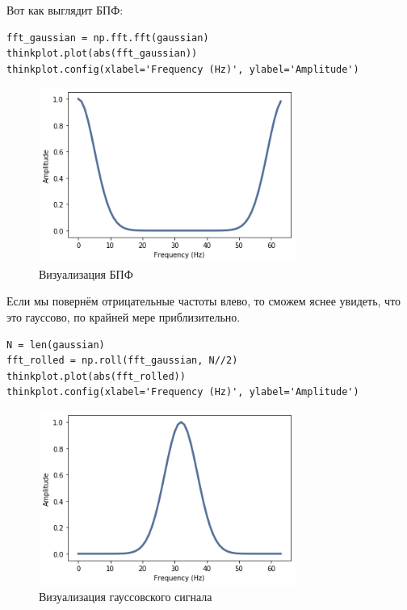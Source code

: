 \documentclass[a4paper,12pt]{report}
\begin{document}
Вот как выглядит БПФ:

\begin{lstlisting}[caption=Визуализация БПФ]
fft_gaussian = np.fft.fft(gaussian)
thinkplot.plot(abs(fft_gaussian))
thinkplot.config(xlabel='Frequency (Hz)', ylabel='Amplitude')
\end{lstlisting}

\begin{figure}[H]
        \centering
        \includegraphics[width=0.75\textwidth]{lab8_fig2_2.png}
        \caption{Визуализация БПФ}
        \label{fig:lab8_fig2_2}
\end{figure}

Если мы повернём отрицательные частоты влево, то сможем яснее увидеть, что это гауссово, по крайней мере приблизительно.

\begin{lstlisting}[caption=Визуализация гауссовского сигнала]
N = len(gaussian)
fft_rolled = np.roll(fft_gaussian, N//2)
thinkplot.plot(abs(fft_rolled))
thinkplot.config(xlabel='Frequency (Hz)', ylabel='Amplitude')
\end{lstlisting}

\begin{figure}[H]
        \centering
        \includegraphics[width=0.75\textwidth]{lab8_fig2_3.png}
        \caption{Визуализация гауссовского сигнала}
        \label{fig:lab8_fig2_3}
\end{figure}
\end{document}

